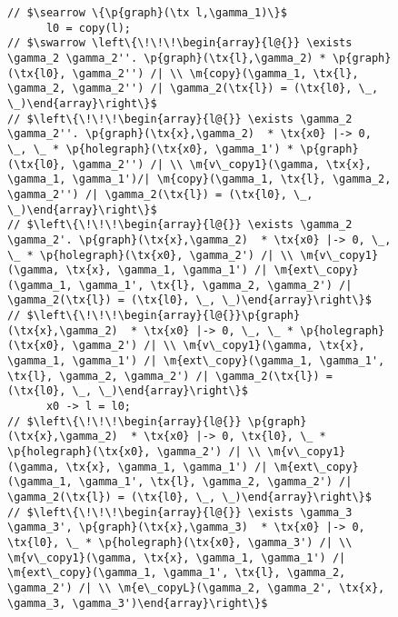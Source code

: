 \begin{figure}
\begin{lstlisting}
// $\searrow \{\p{graph}(\tx l,\gamma_1)\}$
      l0 = copy(l);
// $\swarrow \left\{\!\!\!\begin{array}{l@{}} \exists \gamma_2 \gamma_2''. \p{graph}(\tx{l},\gamma_2) * \p{graph}(\tx{l0}, \gamma_2'') /| \\ \m{copy}(\gamma_1, \tx{l}, \gamma_2, \gamma_2'') /| \gamma_2(\tx{l}) = (\tx{l0}, \_, \_)\end{array}\right\}$
// $\left\{\!\!\!\begin{array}{l@{}} \exists \gamma_2 \gamma_2''. \p{graph}(\tx{x},\gamma_2)  * \tx{x0} |-> 0, \_, \_ * \p{holegraph}(\tx{x0}, \gamma_1') * \p{graph}(\tx{l0}, \gamma_2'') /| \\ \m{v\_copy1}(\gamma, \tx{x}, \gamma_1, \gamma_1')/| \m{copy}(\gamma_1, \tx{l}, \gamma_2, \gamma_2'') /| \gamma_2(\tx{l}) = (\tx{l0}, \_, \_)\end{array}\right\}$
// $\left\{\!\!\!\begin{array}{l@{}} \exists \gamma_2 \gamma_2'. \p{graph}(\tx{x},\gamma_2)  * \tx{x0} |-> 0, \_, \_ * \p{holegraph}(\tx{x0}, \gamma_2') /| \\ \m{v\_copy1}(\gamma, \tx{x}, \gamma_1, \gamma_1') /| \m{ext\_copy}(\gamma_1, \gamma_1', \tx{l}, \gamma_2, \gamma_2') /| \gamma_2(\tx{l}) = (\tx{l0}, \_, \_)\end{array}\right\}$
// $\left\{\!\!\!\begin{array}{l@{}}\p{graph}(\tx{x},\gamma_2)  * \tx{x0} |-> 0, \_, \_ * \p{holegraph}(\tx{x0}, \gamma_2') /| \\ \m{v\_copy1}(\gamma, \tx{x}, \gamma_1, \gamma_1') /| \m{ext\_copy}(\gamma_1, \gamma_1', \tx{l}, \gamma_2, \gamma_2') /| \gamma_2(\tx{l}) = (\tx{l0}, \_, \_)\end{array}\right\}$
      x0 -> l = l0;
// $\left\{\!\!\!\begin{array}{l@{}} \p{graph}(\tx{x},\gamma_2)  * \tx{x0} |-> 0, \tx{l0}, \_ * \p{holegraph}(\tx{x0}, \gamma_2') /| \\ \m{v\_copy1}(\gamma, \tx{x}, \gamma_1, \gamma_1') /| \m{ext\_copy}(\gamma_1, \gamma_1', \tx{l}, \gamma_2, \gamma_2') /| \gamma_2(\tx{l}) = (\tx{l0}, \_, \_)\end{array}\right\}$
// $\left\{\!\!\!\begin{array}{l@{}} \exists \gamma_3 \gamma_3', \p{graph}(\tx{x},\gamma_3)  * \tx{x0} |-> 0, \tx{l0}, \_ * \p{holegraph}(\tx{x0}, \gamma_3') /| \\ \m{v\_copy1}(\gamma, \tx{x}, \gamma_1, \gamma_1') /| \m{ext\_copy}(\gamma_1, \gamma_1', \tx{l}, \gamma_2, \gamma_2') /| \\ \m{e\_copyL}(\gamma_2, \gamma_2', \tx{x}, \gamma_3, \gamma_3')\end{array}\right\}$

\end{lstlisting}
\end{figure}

